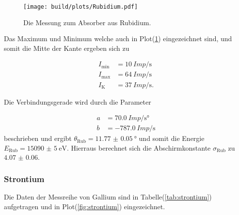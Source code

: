           \begin{figure}
            \centering
            \texttt{[image: build/plots/Rubidium.pdf]}
            \caption{Die Messung zum Absorber aus Rubidium.}
            \label{fig:rub}
          \end{figure}

          \noindent Das Maximum und Minimum welche auch in Plot(\ref{fig:rub}) eingezeichnet sind, und somit die Mitte der Kante ergeben sich 
          zu

          \begin{align*}
              I_{\text{min}} &= \SI{10}{Imp\per\second}\\
              I_{\text{max}} &= \SI{64}{Imp\per\second}\\
              I_{\text{K}} &= \SI{37}{Imp\per\second} .
          \end{align*}

          \noindent Die Verbindungsgerade wird durch die Parameter 

          \begin{align*}
              a & = \SI{70.0}{Imp\per\second\degree}\\
              b & = \SI{-787.0}{Imp\per\second}
          \end{align*}
          \noindent beschrieben und ergibt $\theta_{\text{Rub}} = \SI{11.77(5)}{\degree}$ und somit die Energie $E_{\text{Rub}} = \SI{15090(5)}{\electronvolt}$. 
          Hierraus berechnet sich die Abschirmkonstante $\sigma_{\text{Rub}}$ zu $ \num{4.07(6)}$.

    \subsubsection{Strontium}
            
          \noindent Die Daten der Messreihe von Gallium sind in Tabelle(\ref{tab:strontium}) aufgetragen und in Plot(\ref{fig:strontium}) eingezeichnet.

